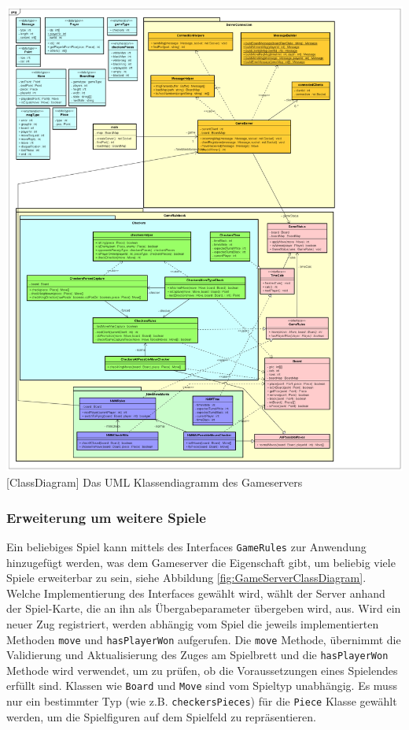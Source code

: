 \documentclass[12pt,a4paper,bibliography=totocnumbered,listof=totocnumbered]{article}
\begin{document}
\vspace{1em}
\begin{minipage}{\linewidth}
	\centering
	\includegraphics[width=1.0\linewidth]{pics/GameServerClassDiagram.png}
	[ClassDiagram]{ Das UML Klassendiagramm des Gameservers }
	\label{fig:GameServerClassDiagram}
\end{minipage}

\subsubsection{Erweiterung um weitere Spiele}
Ein beliebiges Spiel kann mittels des Interfaces \texttt{GameRules} zur Anwendung hinzugefügt werden, was dem Gameserver die Eigenschaft gibt, um 
beliebig viele Spiele erweiterbar zu sein, siehe Abbildung \ref{fig:GameServerClassDiagram}. Welche Implementierung des Interfaces gewählt wird, wählt der Server anhand der Spiel-Karte, die an ihn
als Übergabeparameter übergeben wird, aus. Wird ein neuer Zug registriert, werden abhängig vom Spiel die jeweils implementierten Methoden 
\texttt{move} und \texttt{hasPlayerWon} aufgerufen.
Die \texttt{move} Methode, übernimmt die Validierung und Aktualisierung des Zuges am Spielbrett und
die \texttt{hasPlayerWon} Methode wird verwendet, um zu prüfen, ob die Voraussetzungen eines Spielendes erfüllt sind.
Klassen wie \texttt{Board} und \texttt{Move} sind vom Spieltyp unabhängig. Es muss nur ein bestimmter Typ (wie z.B. \texttt{checkersPieces}) für die \texttt{Piece} 
Klasse gewählt werden, um die Spielfiguren auf dem Spielfeld zu repräsentieren.  
\end{document}
